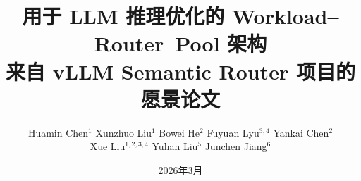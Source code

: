 \documentclass{vllm}
\title{\textbf{用于 LLM 推理优化的 Workload--Router--Pool 架构}\\[4pt]
       {\large 来自 vLLM Semantic Router 项目的愿景论文}}
\author{%
  Huamin Chen$^{1}$ \quad
  Xunzhuo Liu$^{1}$ \quad
  Bowei He$^{2}$ \quad
  Fuyuan Lyu$^{3,4}$ \quad
  Yankai Chen$^{2}$ \\[0.4em]
  Xue Liu$^{1,2,3,4}$ \quad
  Yuhan Liu$^{5}$ \quad
  Junchen Jiang$^{6}$
}
\affiliation[1]{vLLM Semantic Router Project}
\affiliation[2]{MBZUAI}
\affiliation[3]{McGill University}
\affiliation[4]{Mila}
\affiliation[5]{University of Chicago}
\affiliation[6]{Tensormesh Inc.\ /\ UChicago}
\date{2026年3月}
\theoremstyle{plain}
\theoremstyle{definition}
\begin{document}
\maketitle












\begingroup
\small

\endgroup
\end{document}
